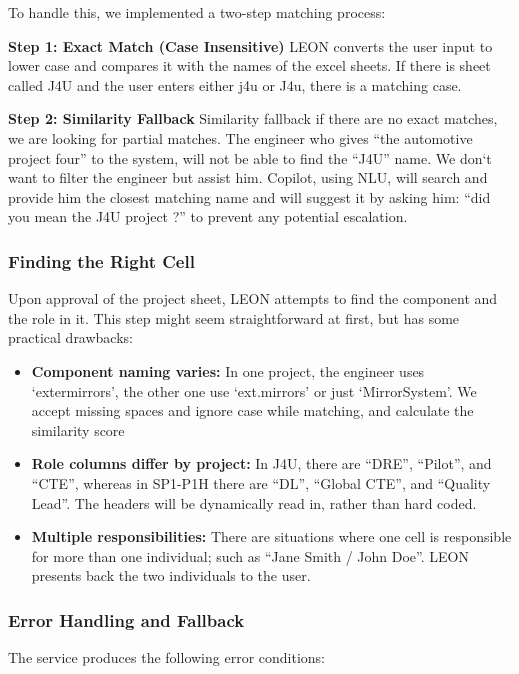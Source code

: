 To handle this, we implemented a two-step matching process:

\textbf{Step 1: Exact Match (Case Insensitive)}  
LEON converts the user input to lower case and compares it with the names of the excel sheets. If there is sheet called J4U and the user enters either j4u or J4u, there is a matching case.

\textbf{Step 2: Similarity Fallback}  
Similarity fallback if there are no exact matches, we are looking for partial matches. The engineer who gives “the automotive project four” to the system, will not be able to find the “J4U” name. We don‘t want to filter the engineer but assist him. Copilot, using NLU, will search and provide him the closest matching name and will suggest it by asking him: “did you mean the J4U project ?” to prevent any potential escalation.

\subsubsection{\textcolor[HTML]{0066CC}{Finding the Right Cell}}

Upon approval of the project sheet, LEON attempts to find the component and the role in it. This step might seem straightforward at first, but has some practical drawbacks:


\begin{itemize}
\item \textbf{Component naming varies:} In one project, the engineer uses ‘extermirrors’, the other one use ‘ext.mirrors’ or just ‘MirrorSystem’. We accept missing spaces and ignore case while matching, and calculate the similarity score
\item \textbf{Role columns differ by project:}  In J4U, there are “DRE”, “Pilot”, and “CTE”, whereas in SP1-P1H there are “DL”, “Global CTE”, and “Quality Lead”. The headers will be dynamically read in, rather than hard coded.
\item \textbf{Multiple responsibilities:} There are situations where one cell is responsible for more than one individual; such as “Jane Smith / John Doe”. LEON presents back the two individuals to the user.
\end{itemize}

\subsubsection{\textcolor[HTML]{0066CC}{Error Handling and Fallback}}

\noindent The service produces the following error conditions:

